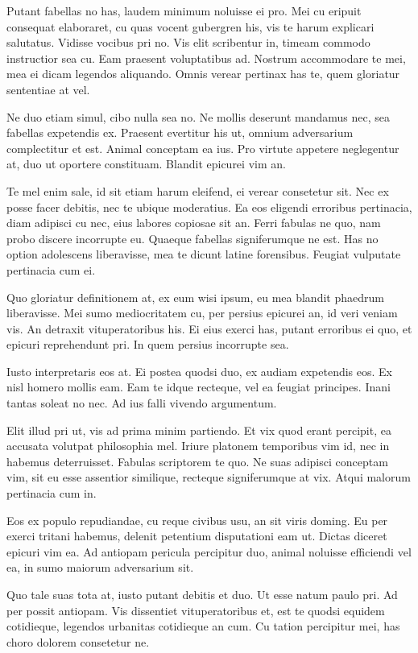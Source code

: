 \documentclass{adhsernotes}
\begin{document}
Putant fabellas no has, laudem minimum noluisse ei pro. Mei cu eripuit consequat
elaboraret, cu quas vocent gubergren his, vis te harum explicari
salutatus. Vidisse vocibus pri no. Vis elit scribentur in, timeam commodo
instructior sea cu. Eam praesent voluptatibus ad. Nostrum accommodare te mei,
mea ei dicam legendos aliquando. Omnis verear pertinax has te, quem gloriatur
sententiae at vel.

Ne duo etiam simul, cibo nulla sea no. Ne mollis deserunt mandamus nec, sea
fabellas expetendis ex. Praesent evertitur his ut, omnium adversarium
complectitur et est. Animal conceptam ea ius. Pro virtute appetere neglegentur
at, duo ut oportere constituam. Blandit epicurei vim an.

Te mel enim sale, id sit etiam harum eleifend, ei verear consetetur sit. Nec ex
posse facer debitis, nec te ubique moderatius. Ea eos eligendi erroribus
pertinacia, diam adipisci cu nec, eius labores copiosae sit an. Ferri fabulas ne
quo, nam probo discere incorrupte eu. Quaeque fabellas signiferumque ne est. Has
no option adolescens liberavisse, mea te dicunt latine forensibus. Feugiat
vulputate pertinacia cum ei.

Quo gloriatur definitionem at, ex eum wisi ipsum, eu mea blandit phaedrum
liberavisse. Mei sumo mediocritatem cu, per persius epicurei an, id veri veniam
vis. An detraxit vituperatoribus his. Ei eius exerci has, putant erroribus ei
quo, et epicuri reprehendunt pri. In quem persius incorrupte sea.

Iusto interpretaris eos at. Ei postea quodsi duo, ex audiam expetendis eos. Ex
nisl homero mollis eam. Eam te idque recteque, vel ea feugiat principes. Inani
tantas soleat no nec. Ad ius falli vivendo argumentum.

Elit illud pri ut, vis ad prima minim partiendo. Et vix quod erant percipit, ea
accusata volutpat philosophia mel. Iriure platonem temporibus vim id, nec in
habemus deterruisset. Fabulas scriptorem te quo. Ne suas adipisci conceptam vim,
sit eu esse assentior similique, recteque signiferumque at vix. Atqui malorum
pertinacia cum in.

Eos ex populo repudiandae, cu reque civibus usu, an sit viris doming. Eu per
exerci tritani habemus, delenit petentium disputationi eam ut. Dictas diceret
epicuri vim ea. Ad antiopam pericula percipitur duo, animal noluisse efficiendi
vel ea, in sumo maiorum adversarium sit.

Quo tale suas tota at, iusto putant debitis et duo. Ut esse natum paulo pri. Ad
per possit antiopam. Vis dissentiet vituperatoribus et, est te quodsi equidem
cotidieque, legendos urbanitas cotidieque an cum. Cu tation percipitur mei, has
choro dolorem consetetur ne.
\end{document}
